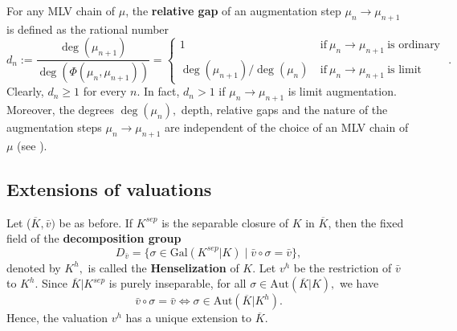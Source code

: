 \documentclass[11pt]{amsart}
\theoremstyle{definition}
\theoremstyle{remark}
\numberwithin{equation}{section}
\begin{document}
 For any MLV chain of $\mu$, the {\bf relative gap} of an augmentation step $\mu_{n}\longrightarrow \mu_{n+1}$ is defined as the rational number
\[d_{n}:=\frac{\deg(\mu_{n+1})}{\deg(\Phi(\mu_{n},\mu_{n+1}))}= \begin{cases} 1 & \text{if} \ \mu_{n}\longrightarrow \mu_{n+1}\ \text{is ordinary }\\ \deg(\mu_{n+1})/\deg(\mu_{n})\ &  \text{if} \ \mu_{n}\longrightarrow \mu_{n+1} \ \text{is limit }\end{cases} .\] Clearly, $d_n\geq 1$ for every $n.$ In fact, $d_n>1$ if $\mu_{n}\longrightarrow \mu_{n+1}$ is limit augmentation. Moreover, the degrees $\deg (\mu_n),$ depth, relative gaps and the nature of the augmentation steps $\mu_{n}\longrightarrow \mu_{n+1}$ are independent of the choice of an MLV chain of $\mu$ (see \cite[Corollary 4.4, Theorem 4.7]{EN1}). 




\subsection{Extensions of valuations}

Let ($\overline{K},\bar{v})$ be as before. If $K^{sep}$ is the separable closure of $K$ in $\overline{K}$, then the fixed field of the {\bf decomposition group}\[D_{\bar{v}}=\{\sigma\in \text{Gal}(K^{sep}|K)\mid\bar{v}\circ\sigma=\bar{v}\},\] denoted by $K^h,$ is called the {\bf Henselization} of $K.$ Let $v^h$ be the restriction of $\bar{v}$ to $K^h.$ Since $\overline{K}|K^{sep}$ is purely inseparable, for all $\sigma\in \text{Aut}(\overline{K}|K),$ we have \[\bar{v}\circ\sigma=\bar{v}\iff \sigma\in \text{Aut}(\overline{K}|K^h).\] Hence, the valuation $v^h$ has a unique extension to $\overline{K}.$
\end{document}
